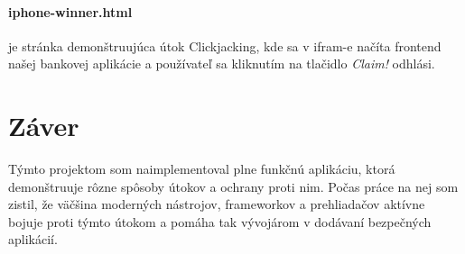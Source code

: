 \documentclass[12pt,a4paper]{article}
\begin{document}
		\paragraph{iphone-winner.html} je stránka demonštruujúca útok Clickjacking, kde sa v ifram-e načíta frontend našej bankovej aplikácie a používateľ sa kliknutím na tlačidlo \textit{Claim!}  odhlási.
		
		
		
\section{Záver}
	Týmto projektom som naimplementoval plne funkčnú aplikáciu, ktorá demonštruuje rôzne spôsoby útokov a ochrany proti nim. Počas práce na nej som zistil, že väčšina moderných nástrojov, frameworkov  a prehliadačov aktívne bojuje proti týmto útokom a pomáha tak vývojárom v dodávaní bezpečných aplikácií.

\newpage
\nocite{*}

\end{document}
